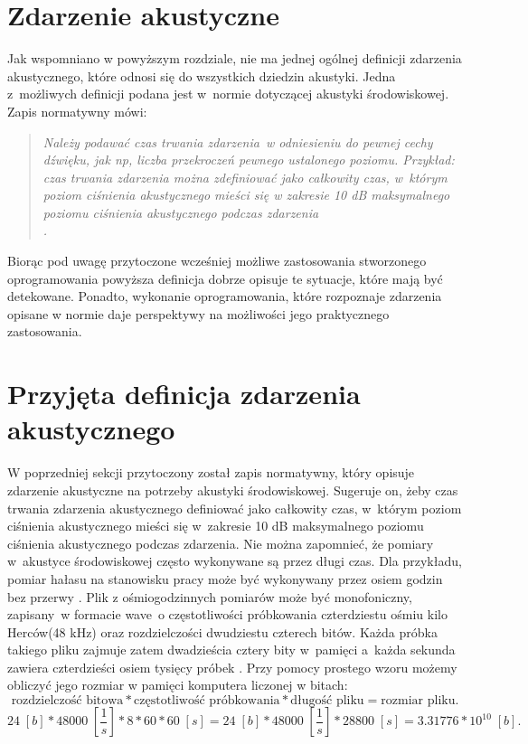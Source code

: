 \documentclass[eng,printmode]{mgr}
\begin{document}
\section{Zdarzenie akustyczne}
Jak wspomniano w powyższym rozdziale, nie ma jednej ogólnej definicji zdarzenia akustycznego, które odnosi się do wszystkich dziedzin akustyki. Jedna z~możliwych definicji podana jest w~normie \cite{PN-ISO-1996-1:2006} dotyczącej akustyki środowiskowej. Zapis normatywny mówi:

\begin{quotation}
\textit{Należy podawać czas trwania zdarzenia~w odniesieniu do pewnej cechy dźwięku, jak np, liczba przekroczeń pewnego ustalonego poziomu. \newline \newline
Przykład: czas trwania zdarzenia można zdefiniować jako całkowity czas, w~którym poziom ciśnienia akustycznego mieści się w zakresie 10 dB maksymalnego poziomu ciśnienia akustycznego podczas zdarzenia\\\cite{PN-ISO-1996-1:2006}.}
\end{quotation}

Biorąc pod uwagę przytoczone wcześniej możliwe zastosowania stworzonego oprogramowania powyższa definicja dobrze opisuje te sytuacje, które mają być detekowane. Ponadto, wykonanie oprogramowania, które rozpoznaje zdarzenia opisane w normie daje perspektywy na możliwości jego praktycznego zastosowania.
\section{Przyjęta definicja zdarzenia akustycznego}
W poprzedniej sekcji przytoczony został zapis normatywny, który opisuje zdarzenie akustyczne na potrzeby akustyki środowiskowej. Sugeruje on, żeby czas trwania zdarzenia akustycznego definiować jako całkowity czas, w~którym poziom ciśnienia akustycznego mieści się w~zakresie 10 dB maksymalnego poziomu ciśnienia akustycznego podczas zdarzenia. 
Nie można zapomnieć, że pomiary w~akustyce środowiskowej często wykonywane są przez długi czas. Dla przykładu, pomiar hałasu na stanowisku pracy może być wykonywany przez osiem godzin bez przerwy \cite{PN-ISO-9612:2011}. Plik z ośmiogodzinnych pomiarów może być monofoniczny, zapisany~w formacie wave~o częstotliwości próbkowania czterdziestu ośmiu kilo Herców(48 kHz) oraz rozdzielczości dwudziestu czterech bitów. Każda próbka takiego pliku zajmuje zatem dwadzieścia cztery bity w~pamięci a~każda sekunda zawiera czterdzieści osiem tysięcy próbek \cite{Principles_of_digital_audio}. Przy pomocy prostego wzoru możemy obliczyć jego rozmiar w pamięci komputera liczonej w bitach:
\begin{equation}
\text{rozdzielczość bitowa} * \text{częstotliwość próbkowania} * \text{długość pliku} = \text{rozmiar pliku}.
\end{equation}
\begin{equation}
24\;[b] * 48000\;[\frac{1}{s}] * 8*60*60\;[s] = 24\;[b] * 48000 \;[\frac{1}{s}] * 28800\;[s] = 3.31776*10^{10} \;[b] .
\end{equation}
\end{document}
